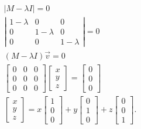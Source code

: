 \begin{align*}
  |M- \lambda I|=0\\
  \left| \begin{matrix} 1-\lambda &0&0\\0&1-\lambda&0\\0&0&1-\lambda \end{matrix} \right| =0\\
  (M-\lambda I)\vec{v} = 0\\
  \begin{bmatrix} 0&0&0\\0&0&0\\0&0&0 \end{bmatrix} \begin{bmatrix} x\\y\\z \end{bmatrix} =\begin{bmatrix} 0\\0\\0 \end{bmatrix} \\
  \begin{bmatrix} x\\y\\z \end{bmatrix} =x\begin{bmatrix} 1\\0\\0 \end{bmatrix} +y\begin{bmatrix} 0\\1\\0 \end{bmatrix} +z\begin{bmatrix} 0\\0\\1 \end{bmatrix} 
.\end{align*}

